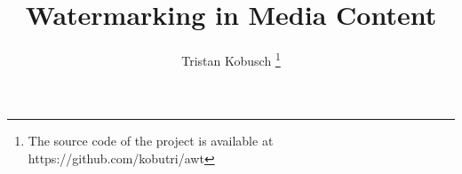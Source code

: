 \documentclass[12pt, technote]{IEEEtran}
\begin{document}
%
\title{Watermarking in Media Content}
%
%
%

\author{Tristan Kobusch \thanks{The source code of the project is available at https://github.com/kobutri/awt}}

% 
%



% 
\end{document}
